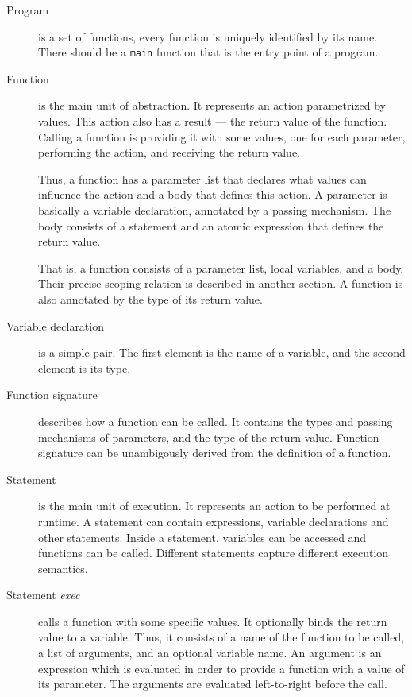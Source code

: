 \documentclass [a4paper] {article}
\begin{document}
\begin {description}

\item [Program] is a set of functions, every function is uniquely identified by
its name. There should be a \texttt{main} function that is the entry point of a
program.

\item [Function] is the main unit of abstraction. It represents an action
parametrized by values. This action also has a result --- the return value of
the function. Calling a function is providing it with some values, one for each
parameter, performing the action, and receiving the return value.

Thus, a function has a parameter list that declares what values can influence
the action and a body that defines this action. A parameter is basically a
variable declaration, annotated by a passing mechanism. The body consists of a
statement and an atomic expression that defines the return value.

That is, a function consists of a parameter list, local variables, and a body.
Their precise scoping relation is described in another section. A function is
also annotated by the type of its return value.

\item [Variable declaration] is a simple pair. The first element is the name
of a variable, and the second element is its type.

\item [Function signature] describes how a function can be called. It contains
the types and passing mechanisms of parameters, and the type of the return
value. Function signature can be unambigously derived from the definition of a
function.

\item [Statement] is the main unit of execution. It represents an action to be
performed at runtime. A statement can contain expressions, variable declarations
and other statements. Inside a statement, variables can be accessed and
functions can be called. Different statements capture different execution
semantics.

\item [Statement \emph{exec}] calls a function with some specific values. It
optionally binds the return value to a variable. Thus, it consists of a name of
the function to be called, a list of arguments, and an optional variable name.
An argument is an expression which is evaluated in order to provide a function
with a value of its parameter. The arguments are evaluated left-to-right before
the call.


\end{description}
\end{document}
